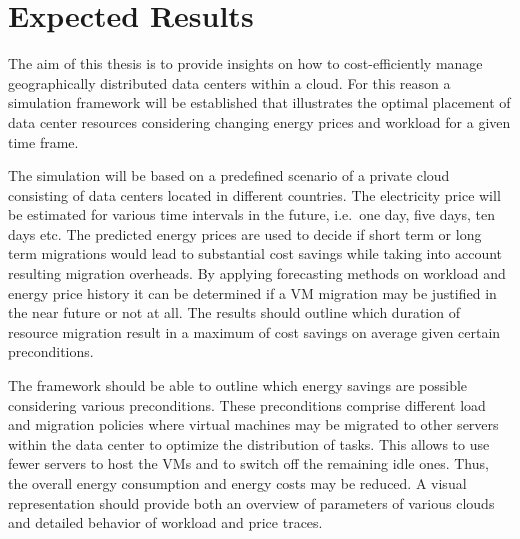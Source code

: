 \documentclass[a4paper]{article}
\begin{document}



\section{Expected Results}

The aim of this thesis is to provide insights on how to cost-efficiently manage geographically distributed data centers within a cloud. For this reason a simulation framework will be established that illustrates the optimal placement of data center resources considering changing energy prices and workload for a given time frame. 

The simulation will be based on a predefined scenario of a private cloud consisting of data centers located in different countries. The electricity price will be estimated for various time intervals in the future, i.e.\ one day, five days, ten days etc. The predicted energy prices are used to decide if short term or long term migrations would lead to substantial cost savings while taking into account resulting migration overheads. 
By applying forecasting methods on workload and energy price history it can be determined if a VM migration may be justified in the near future or not at all. 
The results should outline which duration of resource migration result in a maximum of cost savings on average given certain preconditions. 

The framework should be able to outline which energy savings are possible considering various preconditions. 
These preconditions comprise different load and migration policies where virtual machines may be migrated to other servers within the data center to optimize the distribution of tasks. This allows to use fewer servers to host the VMs and to switch off the remaining idle ones. Thus, the overall energy consumption and energy costs may be reduced. 
A visual representation should provide both an overview of parameters of various clouds and detailed behavior of workload and price traces. 
\end{document}
